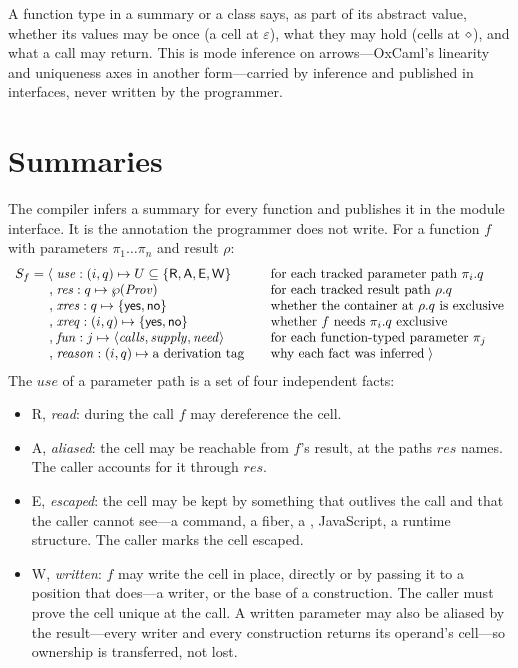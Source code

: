 A function type in a summary or a class says, as part of its abstract value, whether its values may be
once (a cell at $\varepsilon$), what they may hold (cells at $\diamond$), and what a call may return. This is
mode inference on arrows---OxCaml's linearity and uniqueness axes in another form---carried by inference
and published in interfaces, never written by the programmer.

\section{Summaries}
\label{sec:model-summary}

The compiler infers a summary for every function and publishes it in the module interface. It is the
annotation the programmer does not write. For a function $f$ with parameters $\pi_1 \ldots \pi_n$ and
result $\rho$:
\[
\begin{array}{r@{\;}l@{\qquad}l}
S_f = \langle & \mathit{use} : (i, q) \mapsto U \subseteq \{\mathsf{R}, \mathsf{A}, \mathsf{E}, \mathsf{W}\} & \text{for each tracked parameter path } \pi_i.q\\
, & \mathit{res} : q \mapsto \wp(\mathit{Prov}) & \text{for each tracked result path } \rho.q\\
, & \mathit{xres} : q \mapsto \{\mathsf{yes}, \mathsf{no}\} & \text{whether the container at } \rho.q \text{ is exclusive}\\
, & \mathit{xreq} : (i, q) \mapsto \{\mathsf{yes}, \mathsf{no}\} & \text{whether } f \text{ needs } \pi_i.q \text{ exclusive}\\
, & \mathit{fun} : j \mapsto \langle \mathit{calls}, \mathit{supply}, \mathit{need} \rangle & \text{for each function-typed parameter } \pi_j\\
, & \mathit{reason} : (i, q) \mapsto \text{a derivation tag} & \text{why each fact was inferred} \;\rangle
\end{array}
\]
The $\mathit{use}$ of a parameter path is a set of four independent facts:
\begin{itemize}
\item \textsf{R}, \emph{read}: during the call $f$ may dereference the cell.
\item \textsf{A}, \emph{aliased}: the cell may be reachable from $f$'s result, at the paths
$\mathit{res}$ names. The caller accounts for it through $\mathit{res}$.
\item \textsf{E}, \emph{escaped}: the cell may be kept by something that outlives the call and that the
caller cannot see---a command, a fiber, a , JavaScript, a runtime structure. The caller
marks the cell escaped.
\item \textsf{W}, \emph{written}: $f$ may write the cell in place, directly or by passing it to a
position that does---a writer, or the base of a construction. The caller must prove the cell unique at
the call. A written parameter may also be aliased by the result---every writer and every construction
returns its operand's cell---so ownership is transferred, not lost.
\end{itemize}
